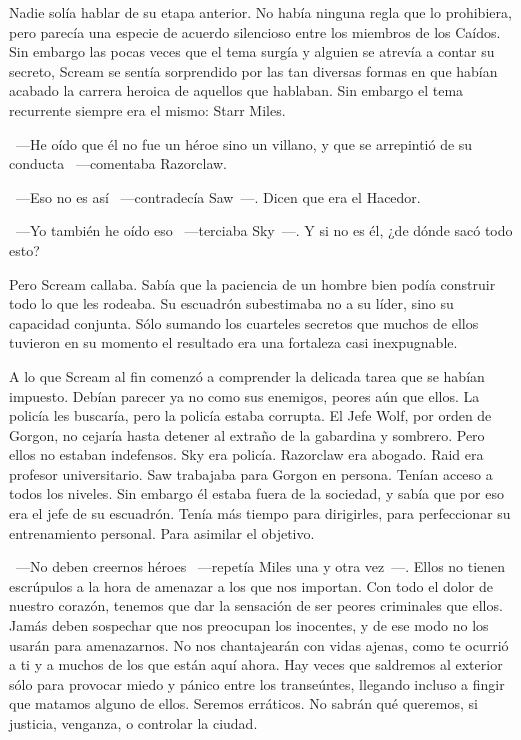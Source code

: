 Nadie solía hablar de su etapa anterior. No había ninguna regla que lo prohibiera, pero parecía una especie de acuerdo silencioso entre los miembros de los Caídos. Sin embargo las pocas veces que el tema surgía y alguien se atrevía a contar su secreto, Scream se sentía sorprendido por las tan diversas formas en que habían acabado la carrera heroica de aquellos que hablaban. Sin embargo el tema recurrente siempre era el mismo: Starr Miles.

~---He oído que él no fue un héroe sino un villano, y que se arrepintió de su conducta ~---comentaba Razorclaw.

~---Eso no es así ~---contradecía Saw~---. Dicen que era el Hacedor.

~---Yo también he oído eso ~---terciaba Sky~---. Y si no es él, ¿de dónde sacó todo esto?

Pero Scream callaba. Sabía que la paciencia de un hombre bien podía construir todo lo que les rodeaba. Su escuadrón subestimaba no a su líder, sino su capacidad conjunta. Sólo sumando los cuarteles secretos que muchos de ellos tuvieron en su momento el resultado era una fortaleza casi inexpugnable.

A lo que Scream al fin comenzó a comprender la delicada tarea que se habían impuesto. Debían parecer ya no como sus enemigos, peores aún que ellos. La policía les buscaría, pero la policía estaba corrupta. El Jefe Wolf, por orden de Gorgon, no cejaría hasta detener al extraño de la gabardina y sombrero. Pero ellos no estaban indefensos. Sky era policía. Razorclaw era abogado. Raid era profesor universitario. Saw trabajaba para Gorgon en persona. Tenían acceso a todos los niveles. Sin embargo él estaba fuera de la sociedad, y sabía que por eso era el jefe de su escuadrón. Tenía más tiempo para dirigirles, para perfeccionar su entrenamiento personal. Para asimilar el objetivo.

~---No deben creernos héroes ~---repetía Miles una y otra vez~---. Ellos no tienen escrúpulos a la hora de amenazar a los que nos importan. Con todo el dolor de nuestro corazón, tenemos que dar la sensación de ser peores criminales que ellos. Jamás deben sospechar que nos preocupan los inocentes, y de ese modo no los usarán para amenazarnos. No nos chantajearán con vidas ajenas, como te ocurrió a ti y a muchos de los que están aquí ahora. Hay veces que saldremos al exterior sólo para provocar miedo y pánico entre los transeúntes, llegando incluso a fingir que matamos alguno de ellos. Seremos erráticos. No sabrán qué queremos, si justicia, venganza, o controlar la ciudad.

